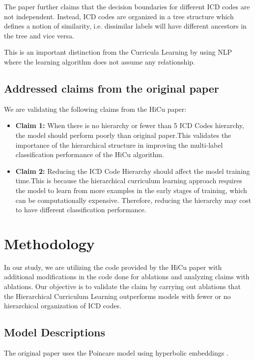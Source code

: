 \documentclass[11pt,a4paper]{article}
\begin{document}
 The paper further claims that the decision boundaries for different ICD codes are not independent. Instead, ICD codes are organized in a tree structure which defines a notion of similarity, i.e. dissimilar labels will have different ancestors in the tree and vice versa.

 This is an important distinction from the Curricula Learning by using NLP \cite{platanios2019competence} where the learning algorithm does not assume any relationship.

\subsection{Addressed claims from the original paper}

We are validating the following claims from the HiCu paper:
\begin{itemize}
    \item \textbf{Claim 1:} When there is no hierarchy or fewer than 5 ICD Codes hierarchy, the model should perform poorly than original paper.This validates the importance of the hierarchical structure in improving the multi-label classification performance of the HiCu algorithm.
    \item \textbf{Claim 2:} Reducing the ICD Code Hierarchy should affect the model training time.This is because the hierarchical curriculum learning approach requires the model to learn from more examples in the early stages of training, which can be computationally expensive. Therefore, reducing the hierarchy may cost to have different classification performance.
\end{itemize}


\section{Methodology}
In our study, we are utilizing the code provided by the HiCu paper with additional modifications in the code done for ablations and analyzing claims with ablations. Our objective is to validate the claim by carrying out ablations that the Hierarchical Curriculum Learning outperforms models with fewer or no hierarchical organization of ICD codes.
\subsection{Model Descriptions}
The original paper uses the Poincare model \cite{nickel2017poincare} using hyperbolic embeddings \cite{sala2018representation}. 
\end{document}
